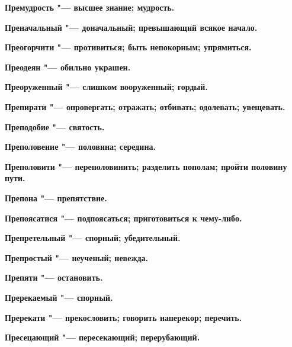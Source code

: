 \bfseries Премудрость \normalfont{} "--- высшее знание; мудрость. 




\bfseries Преначальный \normalfont{} "--- доначальный; превышающий всякое начало. 




\bfseries Преогорчити \normalfont{} "--- противиться; быть непокорным; упрямиться. 




\bfseries Преодеян \normalfont{} "--- обильно украшен. 




\bfseries Преоруженный \normalfont{} "--- слишком вооруженный; гордый. 




\bfseries Препирати \normalfont{} "--- опровергать; отражать; отбивать; одолевать; увещевать. 




\bfseries Преподобие \normalfont{} "--- святость. 




\bfseries Преполовение \normalfont{} "--- половина; середина. 




\bfseries Преполовити \normalfont{} "--- переполовинить; разделить пополам; пройти половину пути. 




\bfseries Препона \normalfont{} "--- препятствие. 




\bfseries Препоясатися \normalfont{} "--- подпоясаться; приготовиться к чему-либо. 




\bfseries Препретельный \normalfont{} "--- спорный; убедительный. 




\bfseries Препростый \normalfont{} "--- неученый; невежда. 




\bfseries Препяти \normalfont{} "--- остановить. 




\bfseries Пререкаемый \normalfont{} "--- спорный. 




\bfseries Пререкати \normalfont{} "--- прекословить; говорить наперекор; перечить. 




\bfseries Пресецающий \normalfont{} "--- пересекающий; перерубающий. 




